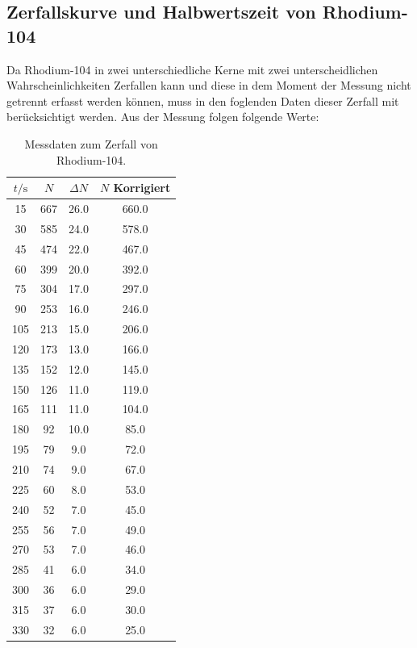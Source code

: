 \subsection{Zerfallskurve und Halbwertszeit von Rhodium-104}
Da Rhodium-104 in zwei unterschiedliche Kerne mit zwei unterscheidlichen Wahrscheinlichkeiten Zerfallen kann und diese in dem Moment der Messung nicht getrennt erfasst werden können,
muss in den foglenden Daten dieser Zerfall mit berücksichtigt werden.
\noindent
Aus der Messung folgen folgende Werte:
\begin{table}
	\centering
	\caption{Messdaten zum Zerfall von Rhodium-104.} 
	\label{tab:rhodium}
	\begin{tabular}{c c c c}
	\toprule
	$t / \si{\second}$ & $N$ & $\Delta N$ &$N$ Korrigiert \\
	\midrule
		15  	& 667  	& 26.0         	& 660.0 \\
		 30  	& 585  	& 24.0         	& 578.0 \\
		 45  	& 474  	& 22.0         	& 467.0 \\
		 60  	& 399  	& 20.0         	& 392.0 \\
		 75  	& 304  	& 17.0         	& 297.0 \\
		 90  	& 253  	& 16.0         	& 246.0 \\
		105  	& 213  	& 15.0         	& 206.0 \\
		120  	& 173  	& 13.0         	& 166.0 \\
		135  	& 152  	& 12.0         	& 145.0 \\
		150  	& 126  	& 11.0         	& 119.0 \\
		165  	& 111  	& 11.0         	& 104.0 \\
		180  	&  92  	& 10.0         	&  85.0 \\
		195  	&  79  	&  9.0         	&  72.0 \\
		210  	&  74  	&  9.0         	&  67.0 \\
		225  	&  60  	&  8.0         	&  53.0 \\
		240  	&  52  	&  7.0         	&  45.0 \\
		255  	&  56  	&  7.0         	&  49.0 \\
		270  	&  53  	&  7.0         	&  46.0 \\
		285  	&  41  	&  6.0         	&  34.0 \\
		300  	&  36  	&  6.0         	&  29.0 \\
		315  	&  37  	&  6.0         	&  30.0 \\
		330  	&  32  	&  6.0         	&  25.0 \\

\end{tabular}
\end{table}

